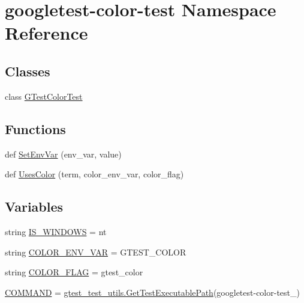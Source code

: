 \hypertarget{namespacegoogletest-color-test}{}\section{googletest-\/color-\/test Namespace Reference}
\label{namespacegoogletest-color-test}
\subsection*{Classes}
\begin{DoxyCompactItemize}
\item 
class \mbox{\hyperlink{classgoogletest-color-test_1_1GTestColorTest}{G\+Test\+Color\+Test}}
\end{DoxyCompactItemize}
\subsection*{Functions}
\begin{DoxyCompactItemize}
\item 
def \mbox{\hyperlink{namespacegoogletest-color-test_a6892a0e83ce77517fa25534cc2c56210}{Set\+Env\+Var}} (env\+\_\+var, value)
\item 
def \mbox{\hyperlink{namespacegoogletest-color-test_a6b0f6528a3b277806378d1b0a7aa09bd}{Uses\+Color}} (term, color\+\_\+env\+\_\+var, color\+\_\+flag)
\end{DoxyCompactItemize}
\subsection*{Variables}
\begin{DoxyCompactItemize}
\item 
string \mbox{\hyperlink{namespacegoogletest-color-test_a07f0b97c52cab5ae5a6b1ad70a76166e}{I\+S\+\_\+\+W\+I\+N\+D\+O\+WS}} = \textquotesingle{}nt\textquotesingle{}
\item 
string \mbox{\hyperlink{namespacegoogletest-color-test_a4ac2cb718d08e0e67fbdd90235860607}{C\+O\+L\+O\+R\+\_\+\+E\+N\+V\+\_\+\+V\+AR}} = \textquotesingle{}G\+T\+E\+S\+T\+\_\+\+C\+O\+L\+OR\textquotesingle{}
\item 
string \mbox{\hyperlink{namespacegoogletest-color-test_ab0f3fdc147b4742a8c797dfa37de9b96}{C\+O\+L\+O\+R\+\_\+\+F\+L\+AG}} = \textquotesingle{}gtest\+\_\+color\textquotesingle{}
\item 
\mbox{\hyperlink{namespacegoogletest-color-test_a4095c8c816acd62b69a8740dcea2bf52}{C\+O\+M\+M\+A\+ND}} = \mbox{\hyperlink{namespacegtest__test__utils_a89ed3717984a80ffbb7a9c92f71b86a2}{gtest\+\_\+test\+\_\+utils.\+Get\+Test\+Executable\+Path}}(\textquotesingle{}googletest-\/color-\/test\+\_\+\textquotesingle{})
\end{DoxyCompactItemize}


